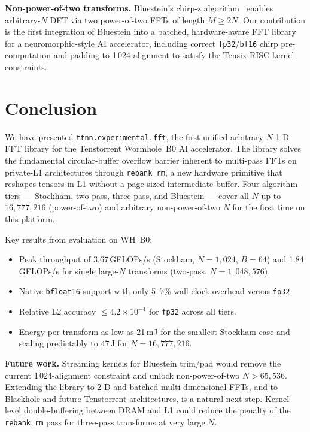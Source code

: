 \documentclass[conference]{IEEEtran}
\begin{document}
\textbf{Non-power-of-two transforms.}
Bluestein's chirp-z algorithm~\cite{bluestein} enables arbitrary-$N$ DFT via
two power-of-two FFTs of length $M \geq 2N$. Our contribution is the first
integration of Bluestein into a batched, hardware-aware FFT library for a
neuromorphic-style AI accelerator, including correct \texttt{fp32}/\texttt{bf16}
chirp pre-computation and padding to 1\,024-alignment to satisfy the Tensix
RISC kernel constraints.

\section{Conclusion}
\label{sec:conclusion}

We have presented \texttt{ttnn.experimental.fft}, the first unified
arbitrary-$N$ 1-D FFT library for the Tenstorrent Wormhole~B0 AI accelerator.
The library solves the fundamental circular-buffer overflow barrier inherent to
multi-pass FFTs on private-L1 architectures through \texttt{rebank\_rm}, a new
hardware primitive that reshapes tensors in L1 without a page-sized intermediate
buffer. Four algorithm tiers — Stockham, two-pass, three-pass, and Bluestein —
cover all $N$ up to $16{,}777{,}216$ (power-of-two) and arbitrary non-power-of-two
$N$ for the first time on this platform.

Key results from evaluation on WH~B0:
\begin{itemize}
  \item Peak throughput of 3.67\,GFLOPs/s (Stockham, $N=1{,}024$, $B=64$)
        and 1.84\,GFLOPs/s for single large-$N$ transforms (two-pass,
        $N=1{,}048{,}576$).
  \item Native \texttt{bfloat16} support with only 5–7\% wall-clock
        overhead versus \texttt{fp32}.
  \item Relative L2 accuracy $\leq 4.2{\times}10^{-4}$ for \texttt{fp32}
        across all tiers.
  \item Energy per transform as low as 21\,mJ for the smallest Stockham case
        and scaling predictably to 47\,J for $N = 16{,}777{,}216$.
\end{itemize}

\textbf{Future work.}
Streaming kernels for Bluestein trim/pad would remove the current 1\,024-alignment
constraint and unlock non-power-of-two $N > 65{,}536$. Extending the library to
2-D and batched multi-dimensional FFTs, and to Blackhole and future Tenstorrent
architectures, is a natural next step. Kernel-level double-buffering between DRAM
and L1 could reduce the penalty of the \texttt{rebank\_rm} pass for three-pass
transforms at very large $N$.



\end{document}
